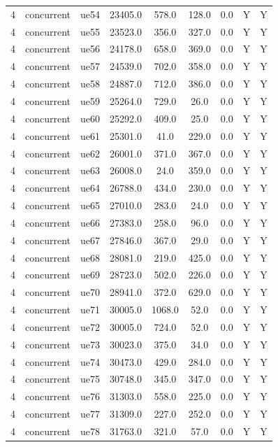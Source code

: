 \begin{table}[ht]
\begin{tabular}{|c|c|c|c|c|c|c|c|c|}
4 & concurrent & ue54 & 23405.0 & 578.0 & 128.0 & 0.0 & Y & Y \\
4 & concurrent & ue55 & 23523.0 & 356.0 & 327.0 & 0.0 & Y & Y \\
4 & concurrent & ue56 & 24178.0 & 658.0 & 369.0 & 0.0 & Y & Y \\
4 & concurrent & ue57 & 24539.0 & 702.0 & 358.0 & 0.0 & Y & Y \\
4 & concurrent & ue58 & 24887.0 & 712.0 & 386.0 & 0.0 & Y & Y \\
4 & concurrent & ue59 & 25264.0 & 729.0 & 26.0 & 0.0 & Y & Y \\
4 & concurrent & ue60 & 25292.0 & 409.0 & 25.0 & 0.0 & Y & Y \\
4 & concurrent & ue61 & 25301.0 & 41.0 & 229.0 & 0.0 & Y & Y \\
4 & concurrent & ue62 & 26001.0 & 371.0 & 367.0 & 0.0 & Y & Y \\
4 & concurrent & ue63 & 26008.0 & 24.0 & 359.0 & 0.0 & Y & Y \\
4 & concurrent & ue64 & 26788.0 & 434.0 & 230.0 & 0.0 & Y & Y \\
4 & concurrent & ue65 & 27010.0 & 283.0 & 24.0 & 0.0 & Y & Y \\
4 & concurrent & ue66 & 27383.0 & 258.0 & 96.0 & 0.0 & Y & Y \\
4 & concurrent & ue67 & 27846.0 & 367.0 & 29.0 & 0.0 & Y & Y \\
4 & concurrent & ue68 & 28081.0 & 219.0 & 425.0 & 0.0 & Y & Y \\
4 & concurrent & ue69 & 28723.0 & 502.0 & 226.0 & 0.0 & Y & Y \\
4 & concurrent & ue70 & 28941.0 & 372.0 & 629.0 & 0.0 & Y & Y \\
4 & concurrent & ue71 & 30005.0 & 1068.0 & 52.0 & 0.0 & Y & Y \\
4 & concurrent & ue72 & 30005.0 & 724.0 & 52.0 & 0.0 & Y & Y \\
4 & concurrent & ue73 & 30023.0 & 375.0 & 34.0 & 0.0 & Y & Y \\
4 & concurrent & ue74 & 30473.0 & 429.0 & 284.0 & 0.0 & Y & Y \\
4 & concurrent & ue75 & 30748.0 & 345.0 & 347.0 & 0.0 & Y & Y \\
4 & concurrent & ue76 & 31303.0 & 558.0 & 225.0 & 0.0 & Y & Y \\
4 & concurrent & ue77 & 31309.0 & 227.0 & 252.0 & 0.0 & Y & Y \\
4 & concurrent & ue78 & 31763.0 & 321.0 & 57.0 & 0.0 & Y & Y \\

\end{tabular}
\end{table}
